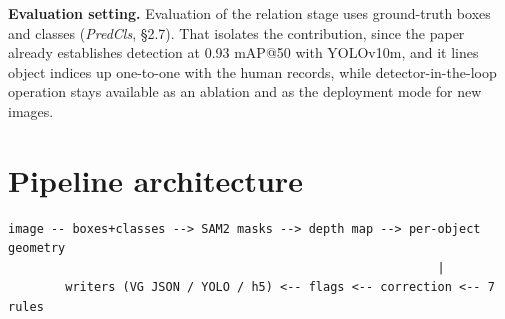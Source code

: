 \textbf{Evaluation setting.} Evaluation of the relation stage uses ground-truth boxes and classes (\textit{PredCls}, \S{}2.7). That isolates the contribution, since the paper already establishes detection at 0.93 mAP@50 with YOLOv10m, and it lines object indices up one-to-one with the human records, while detector-in-the-loop operation stays available as an ablation and as the deployment mode for new images.

\section{Pipeline architecture}

\begingroup\small\begin{verbatim}
image -- boxes+classes --> SAM2 masks --> depth map --> per-object geometry
                                                            |
        writers (VG JSON / YOLO / h5) <-- flags <-- correction <-- 7 rules
\end{verbatim}\endgroup

